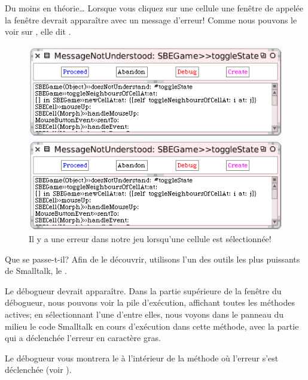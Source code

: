 \documentclass[a4paper,10pt,twoside]{book}
\begin{document}
Du moins en théorie\ldots{}
Lorsque vous cliquez sur une cellule une fen\^etre de  appelée la fen\^etre  devrait apparaître avec un message d'erreur!
Comme nous pouvons le voir sur , elle dit .

\begin{figure}[ht]
\ifluluelse
	{\centerline{\includegraphics[width=\textwidth]{Error}}}
	{\centerline{\includegraphics[scale=0.7]{Error}}}
\caption{Il y a une erreur dans notre jeu lorsqu'une cellule est sélectionnée!
\label{fig:quintoError}}
\end{figure}

\noindent
Que se passe-t-il? Afin de le découvrir, utilisons l'un des outils les plus puissants de Smalltalk, le .

Le débogueur devrait apparaître.
Dans la partie supérieure de la fen\^etre du débogueur, nous pouvons
voir la pile d'exécution, affichant toutes les méthodes actives; en
sélectionnant l'une d'entre elles, nous voyons dans le panneau du
milieu le code Smalltalk en cours d'exécution dans cette méthode, avec
la partie qui a déclenchée l'erreur en caractère gras.

Le débogueur vous montrera le  à l'intérieur
de la méthode o\`u l'erreur s'est déclenchée (voir ).
\end{document}
